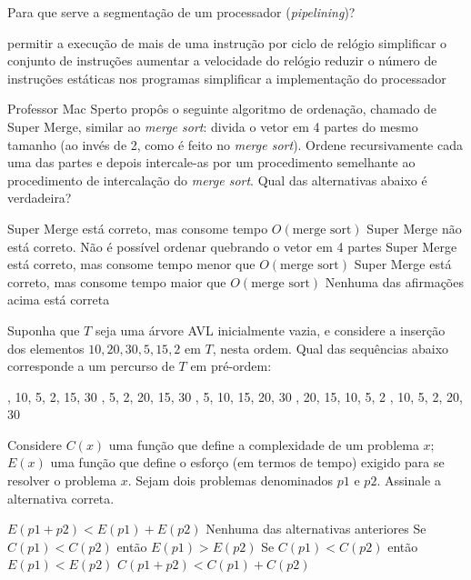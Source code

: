 \documentclass[12pt, addpoints]{exam}
\begin{document}
\begin{questions}
\question

Para que serve a segmentação de um processador (\textit{pipelining})?
\begin{choices}
\choice permitir a execução de mais de uma instrução por ciclo de relógio
\choice simplificar o conjunto de instruções
\choice aumentar a velocidade do relógio
\choice reduzir o número de instruções estáticas nos programas
\choice simplificar a implementação do processador
\end{choices}

\question

Professor Mac Sperto propôs o seguinte algoritmo de ordenação, chamado de Super Merge, similar ao \textit{merge sort}: divida o vetor em 4 partes do mesmo tamanho (ao invés de 2, como é feito no \textit{merge sort}). Ordene recursivamente cada uma das partes e depois intercale-as por um procedimento semelhante ao procedimento de intercalação do \textit{merge sort}. Qual das alternativas abaixo é verdadeira?
\begin{choices}
\choice Super Merge está correto, mas consome tempo \( O(\text{merge sort}) \)
\choice Super Merge não está correto. Não é possível ordenar quebrando o vetor em 4 partes
\choice Super Merge está correto, mas consome tempo menor que \( O(\text{merge sort}) \)
\choice Super Merge está correto, mas consome tempo maior que \( O(\text{merge sort}) \)
\choice Nenhuma das afirmações acima está correta
\end{choices}

\question

Suponha que \( T \) seja uma árvore AVL inicialmente vazia, e considere a inserção dos elementos \(10, 20, 30, 5, 15, 2\) em \( T \), nesta ordem. Qual das sequências abaixo corresponde a um percurso de \( T \) em pré-ordem:
\begin{choices}
, 10, 5, 2, 15, 30
, 5, 2, 20, 15, 30
, 5, 10, 15, 20, 30
, 20, 15, 10, 5, 2
, 10, 5, 2, 20, 30
\end{choices}

\question

Considere \( C(x) \) uma função que define a complexidade de um problema \( x \); \( E(x) \) uma função que define o esforço (em termos de tempo) exigido para se resolver o problema \( x \). Sejam dois problemas denominados \( p1 \) e \( p2 \). Assinale a alternativa correta.


\begin{choices}
\choice \( E(p1 + p2) < E(p1) + E(p2) \)
\choice Nenhuma das alternativas anteriores
\choice Se \( C(p1) < C(p2) \) então \( E(p1) > E(p2) \)
\choice Se \( C(p1) < C(p2) \) então \( E(p1) < E(p2) \)
\choice \( C(p1 + p2) < C(p1) + C(p2) \)
\end{choices}


\end{questions}
\end{document}
